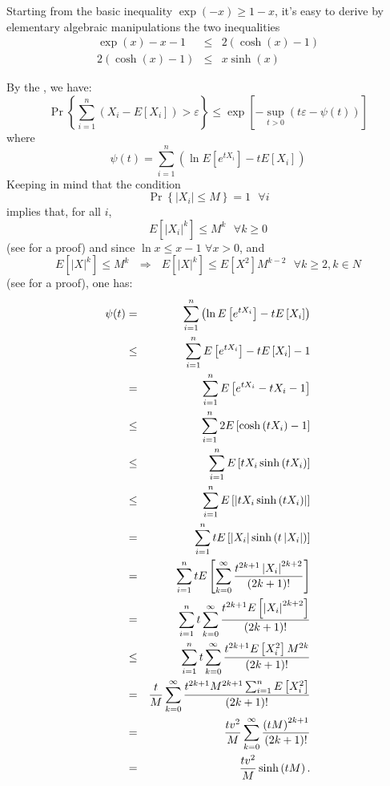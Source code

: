 \documentclass[12pt]{article}
\begin{document}
Starting from the basic inequality $\exp \left( -x\right) \geq 1-x$, it's
easy to derive by elementary algebraic manipulations the two inequalities
\begin{eqnarray*}
\exp \left( x\right) -x-1 &\leq &2\left( \cosh \left( x\right) -1\right) \\
2\left( \cosh \left( x\right) -1\right) &\leq &x\sinh \left( x\right)
\end{eqnarray*}

By the , we have:
\[
\Pr\left\{ \sum_{i=1}^{n}\left( X_{i}-E[X_{i}]\right) >\varepsilon \right\}
\leq \exp \left[ -\sup_{t>0}\left( t\varepsilon -\psi (t)\right) \right] 
\]
where
\[
\psi (t)=\sum_{i=1}^{n}\left( \ln E\left[ e^{tX_{i}}\right] -tE\left[ X_{i}%
\right] \right) 
\]
Keeping in mind that the condition
\[
\Pr\left\{ \left\vert X_{i}\right\vert \leq M\right\} =1\text{ \ }\forall i
\]
implies that, for all $i$,
\[
E[\left\vert X_{i}\right\vert ^{k}]\leq M^{k} \text{ \ }\forall k\geq 0
\]
(see  for a proof) and since $\ln x\leq x-1$ $\forall x>0$, and%
\[
E[\left\vert X\right\vert ^{k}]\leq M^{k}\text{ \ }\Longrightarrow \text{ \ }%
E\left[ \left\vert X\right\vert ^{k}\right] \leq E\left[ X^{2}\right] M^{k-2}%
\text{ \ \ \ \ \ \ \ }\forall k\geq 2,k\in N
\]
(see  for a proof), one has:
\begin{eqnarray*}
\psi (t) &=&\sum_{i=1}^{n}\left( \ln E\left[ e^{tX_{i}}\right] -tE\left[
X_{i}\right] \right)  \\
&\leq &\sum_{i=1}^{n}E\left[ e^{tX_{i}}\right] -tE\left[ X_{i}\right] -1 \\
&=&\sum_{i=1}^{n}E\left[ e^{tX_{i}}-tX_{i}-1\right]  \\
&\leq &\sum_{i=1}^{n}2E\left[ \cosh \left( tX_{i}\right) -1\right]  \\
&\leq &\sum_{i=1}^{n}E\left[ tX_{i}\sinh \left( tX_{i}\right) \right]  \\
&\leq &\sum_{i=1}^{n}E\left[ \left\vert tX_{i}\sinh \left( tX_{i}\right)
\right\vert \right]  \\
&=&\sum_{i=1}^{n}tE\left[ \left\vert X_{i}\right\vert \sinh \left(
t\left\vert X_{i}\right\vert \right) \right]  \\
&=&\sum_{i=1}^{n}tE\left[ \sum_{k=0}^{\infty }\frac{t^{2k+1}\left\vert
X_{i}\right\vert ^{2k+2}}{\left( 2k+1\right) !}\right]  \\
&=&\sum_{i=1}^{n}t\sum_{k=0}^{\infty }\frac{t^{2k+1}E\left[ \left\vert
X_{i}\right\vert ^{2k+2}\right] }{\left( 2k+1\right) !} \\
&\leq &\sum_{i=1}^{n}t\sum_{k=0}^{\infty }\frac{t^{2k+1}E\left[ X_{i}^{2}%
\right] M^{2k}}{\left( 2k+1\right) !} \\
&=&\frac{t}{M}\sum_{k=0}^{\infty }\frac{t^{2k+1}M^{2k+1}\sum_{i=1}^{n}E\left[
X_{i}^{2}\right] }{\left( 2k+1\right) !} \\
&=&\frac{tv^{2}}{M}\sum_{k=0}^{\infty }\frac{\left( tM\right) ^{2k+1}}{%
\left( 2k+1\right) !} \\
&=&\frac{tv^{2}}{M}\sinh \left( tM\right) .
\end{eqnarray*}
\end{document}
